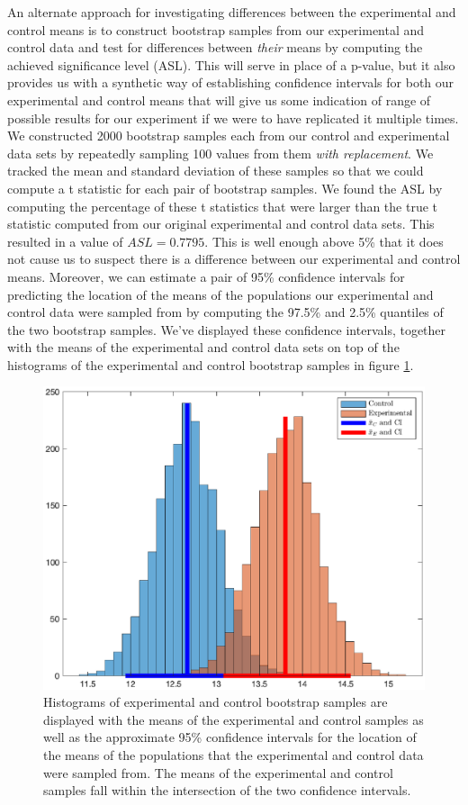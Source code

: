 \documentclass{amsart}
\begin{document}
An alternate approach for investigating differences between the experimental and control means is to construct bootstrap samples from our experimental and control data and test for differences between \textsl{their} means by computing the achieved significance level (ASL). This will serve in place of a p-value, but it also provides us with a synthetic way of establishing confidence intervals for both our experimental and control means that will give us some indication of range of possible results for our experiment if we were to have replicated it multiple times. We constructed 2000 bootstrap samples each from our control and experimental data sets by repeatedly sampling 100 values from them \textsl{with replacement}. We tracked the mean and standard deviation of these samples so that we could compute a t statistic for each pair of bootstrap samples. We found the ASL by computing the percentage of these t statistics that were larger than the true t statistic computed from our original experimental and control data sets. This resulted in a value of $ASL=0.7795$. This is well enough above 5\% that it does not cause us to suspect there is a difference between our experimental and control means. Moreover, we can estimate a pair of 95\% confidence intervals for predicting the location of the means of the populations our experimental and control data were sampled from by computing the 97.5\% and 2.5\% quantiles of the two bootstrap samples. We've displayed these confidence intervals, together with the means of the experimental and control data sets on top of the histograms of the experimental and control bootstrap samples in figure \ref{F:bootstrapTwoSample}.
\begin{figure}[H]
\centering
\includegraphics[scale=0.55]{bootstrapTwoSample}
\caption{
Histograms of experimental and control bootstrap samples are displayed with the means of the experimental and control samples as well as the approximate 95\% confidence intervals for the location of the means of the populations that the experimental and control data were sampled from. The means of the experimental and control samples fall within the intersection of the two confidence intervals.\label{F:bootstrapTwoSample}}
\end{figure}
\end{document}
